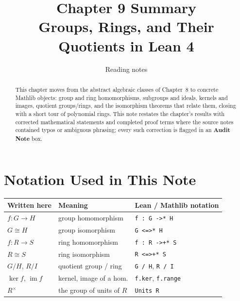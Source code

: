 \documentclass[11pt]{article}
\title{\vspace{-1.5cm}\textbf{Chapter 9 Summary}\\[2pt]\Large Groups, Rings, and Their Quotients in Lean 4}
\author{Reading notes}
\date{}
\begin{document}
\maketitle
\vspace{-0.6cm}

\begin{abstract}
\noindent This chapter moves from the abstract algebraic classes of Chapter~8 to concrete Mathlib objects: group and ring homomorphisms, subgroups and ideals, kernels and images, quotient groups/rings, and the isomorphism theorems that relate them, closing with a short tour of polynomial rings. This note restates the chapter's results with corrected mathematical statements and completed proof terms where the source notes contained typos or ambiguous phrasing; every such correction is flagged in an \textcolor{red!45!black}{\textbf{Audit Note}} box.
\end{abstract}
\vspace{-0.3cm}
\tableofcontents

\section*{Notation Used in This Note}
\renewcommand{\arraystretch}{1.25}
\begin{center}
\begin{tabular}{@{}p{3.4cm}p{5.6cm}p{5.6cm}@{}}
\toprule
\textbf{Written here} & \textbf{Meaning} & \textbf{Lean / Mathlib notation} \\
\midrule
$f : G \to H$ & group homomorphism & \verb|f : G ->* H| \\
$G \cong H$ & group isomorphism & \verb|G <=>* H| \\
$f : R \to S$ & ring homomorphism & \verb|f : R ->+* S| \\
$R \cong S$ & ring isomorphism & \verb|R <=>+* S| \\
$G/H$, $R/I$ & quotient group / ring & \verb|G / H|, \verb|R / I| \\
$\ker f$, $\operatorname{im} f$ & kernel, image of a hom. & \verb|f.ker|, \verb|f.range| \\
$R^\times$ & the group of units of $R$ & \verb|Units R| \\
\bottomrule
\end{tabular}
\end{center}
\end{document}
